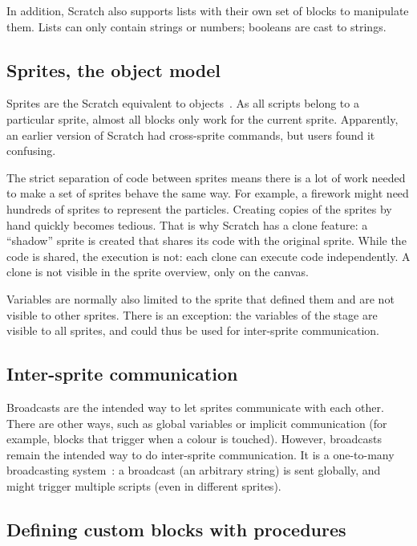 \documentclass[../main]{subfiles}
\begin{document}
In addition, Scratch also supports lists with their own set of blocks to manipulate them.
Lists can only contain strings or numbers; booleans are cast to strings.

\subsection{Sprites, the object model}\label{subsec:sprites-the-object-model}

Sprites are the Scratch equivalent to objects~\autocite{maloneyScratchProgrammingLanguage2010a}.
As all scripts belong to a particular sprite, almost all blocks only work for the current sprite.
Apparently, an earlier version of Scratch had cross-sprite commands, but users found it confusing.

The strict separation of code between sprites means there is a lot of work needed to make a set of sprites behave the same way.
For example, a firework might need hundreds of sprites to represent the particles.
Creating copies of the sprites by hand quickly becomes tedious.
That is why Scratch has a clone feature: a ``shadow'' sprite is created that shares its code with the original sprite.
While the code is shared, the execution is not: each clone can execute code independently.
A clone is not visible in the sprite overview, only on the canvas.

Variables are normally also limited to the sprite that defined them and are not visible to other sprites.
There is an exception: the variables of the stage are visible to all sprites, and could thus be used for inter-sprite communication.

\subsection{Inter-sprite communication}\label{subsec:intersprite-communications}

\textcolor{screvent}{Broadcasts} are the intended way to let sprites communicate with each other.
There are other ways, such as global variables or implicit communication (for example, blocks that trigger when a colour is touched).
However, broadcasts remain the intended way to do inter-sprite communication.
It is a one-to-many broadcasting system~\autocite{maloneyScratchProgrammingLanguage2010a}: a broadcast (an arbitrary string) is sent globally, and might trigger multiple scripts (even in different sprites).

\subsection{Defining custom blocks with procedures}\label{subsec:defining-custom-blocks-with-procedures}
\end{document}
